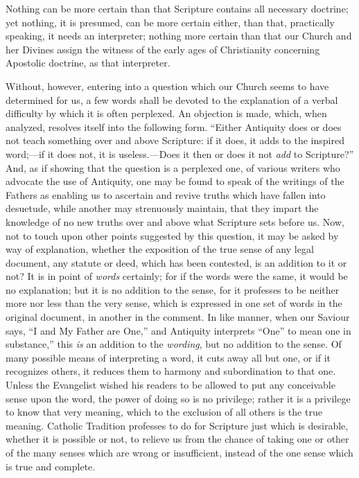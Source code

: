 Nothing can be more certain
than that Scripture contains all necessary doctrine; yet nothing, it
is presumed, can be more certain either, than that, practically
speaking, it needs an interpreter; nothing more certain than that our
Church and her Divines assign the witness of the early ages of
Christianity concerning Apostolic doctrine, as that interpreter.

Without, however, entering
into a question which our Church seems to have determined for us, a
few words shall be devoted to the explanation of a verbal difficulty
by which it is often perplexed. An objection is made, which, when
analyzed, resolves itself into the following form. ``Either
Antiquity does or does not teach something over and above Scripture:
if it does, it adds to the inspired word;—if it does not, it is
useless.—Does it then or does it not \emph{add} to Scripture?'' And,
as if showing that the question is a perplexed one, of various writers
who advocate the use of Antiquity, one may be found to speak of the
writings of the Fathers as enabling us to ascertain and revive truths
which have fallen into desuetude, while another may strenuously
maintain, that they impart the knowledge of no new truths over and
above what Scripture sets before us. Now, not to touch upon other
points suggested by this question, it may be asked by way of
explanation, whether the exposition of the true sense of any legal
document, any statute or deed, which has been contested, is an
addition to it or not? It is in point of \emph{words} certainly; for
if the words were the same, it would be no explanation; but it is no
addition to the sense, for it professes to be neither more nor less
than the very sense, which is expressed in one set of words in the
original document, in another in the comment. In like manner, when our
Saviour says, ``I and My Father are One,'' and Antiquity interprets ``One''
to mean one in substance,'' this \emph{is} an addition to the \emph{wording},
but no addition to the sense. Of many possible means of interpreting a
word, it cuts away all but one, or if it recognizes others, it reduces
them to harmony and subordination to that one. Unless the Evangelist
wished his readers to be allowed to put any conceivable sense upon the
word, the power of doing so is no privilege; rather it is a privilege
to know that very meaning, which to the exclusion of all others is the
true meaning. Catholic Tradition professes to do for Scripture just
which is desirable, whether it is possible or not, to relieve us from
the chance of taking one or other of the many senses which are wrong
or insufficient, instead of the one sense which is true and complete.

